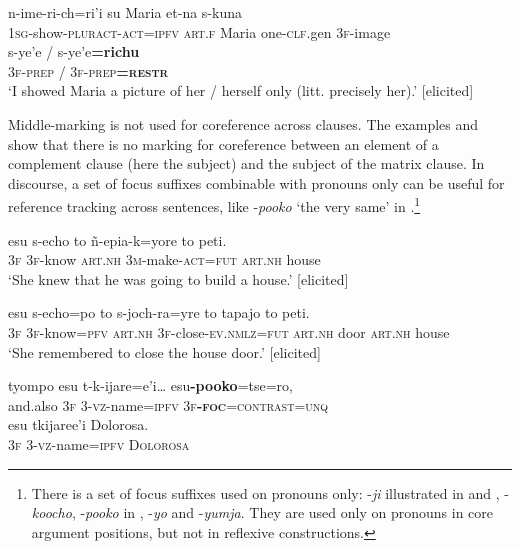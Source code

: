 \documentclass[output=paper]{langscibook}
\begin{document}
\ea
\label{ex:Rose:30}
\gll n-ime-ri-ch=ri'i su Maria et-na s-kuna \\
1\textsc{sg}-show-\textsc{pluract-act=ipfv} \textsc{art.f} Maria one-\textsc{clf.}gen 3\textsc{f}-image\\

\gll s-ye'e / s-ye'e\textbf{=richu} \\
\textsc{3f-prep} \textsc{/} \textsc{3f-prep\textbf{=restr}}\\
\glt ‘I showed Maria a picture of her / herself only (litt. precisely her).’ [elicited]
\z


Middle-marking is not used for coreference across clauses. The examples  and  show that there is no marking for coreference between an element of a complement clause (here the subject) and the subject of the matrix clause. In discourse, a set of focus suffixes combinable with pronouns only can be useful for reference tracking across sentences, like -\textit{pooko} ‘the very same’ in .\footnote{There is a set of focus suffixes used on pronouns only: -\textit{ji} illustrated in  and , -\textit{koocho}, -\textit{pooko} in , -\textit{yo} and -\textit{yumja}. They are used only on pronouns in core argument positions, but not in reflexive constructions.}


\ea
\label{ex:Rose:31}
\gll esu s-echo to ñ-epia-k=yore to peti.\\
\textsc{3f} \textsc{3f}-know \textsc{art.nh} \textsc{3m}-make-\textsc{act=fut} \textsc{art.nh} house\\
\glt ‘She knew that he was going to build a house.’ [elicited]
\z

\ea
\label{ex:Rose:32}
\gll esu s-echo=po to s-joch-ra=yre to tapajo to peti.\\
\textsc{3f} \textsc{3f}-know=\textsc{pfv} \textsc{art.nh} \textsc{3f-}close-\textsc{ev.nmlz=fut} \textsc{art.nh} door \textsc{art.nh} house\\
\glt ‘She remembered to close the house door.’ [elicited]
\z

\ea
\label{ex:Rose:33}
\gll tyompo esu t-k-ijare=e'i… esu\textbf{-pooko}=tse=ro,\\
and.also 3\textsc{f} 3-\textsc{vz}-name=\textsc{ipfv} \textsc{3f\textbf{-foc}=contrast=unq}\\
\gll esu tkijaree'i Dolorosa.\\
3\textsc{f} 3-\textsc{vz}-name=\textsc{ipfv} \textsc{\textup{Dolorosa}}\\
\end{document}

